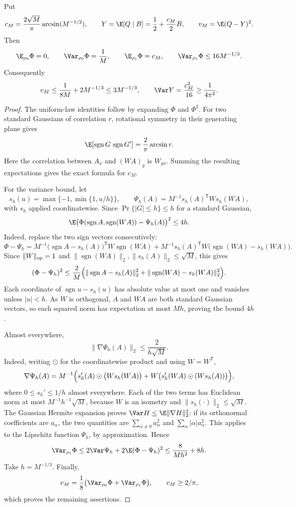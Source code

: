 \begin{lemma}\label{ian:forrelation-flatness}
Put
\[
 c_M=\frac{2\sqrt M}{\pi}\arcsin(M^{-1/2}),
 \qquad
 Y=\E[Q\mid B]=\frac12+\frac{c_M}{2}B,
 \qquad
 v_M=\E(Q-Y)^2.
\]
Then
\[
 \E_{\rho_0}\Phi=0,\qquad
 \Var_{\rho_0}\Phi=\frac1M,\qquad
 \E_{\rho_1}\Phi=c_M,\qquad
 \Var_{\rho_1}\Phi\le16M^{-1/3}.
\]
Consequently
\[
 v_M\le\frac1{8M}+2M^{-1/3}\le3M^{-1/3},
 \qquad
 \Var Y=\frac{c_M^2}{16}\ge\frac1{4\pi^2}.
\]
\end{lemma}
\begin{proof}
The uniform-law identities follow by expanding \(\Phi\) and \(\Phi^2\). For two standard Gaussians of correlation \(r\), rotational symmetry in their generating plane gives
\[
 \E[\operatorname{sgn}G\,\operatorname{sgn}G']
 =\frac2\pi\arcsin r.
\]
Here the correlation between \(A_x\) and \((WA)_y\) is \(W_{yx}\). Summing the resulting expectations gives the exact formula for \(c_M\).

For the variance bound, let
\[
 s_h(u)=\max\{-1,\min\{1,u/h\}\},\qquad
 \Psi_h(A)=M^{-1}s_h(A)^{\mathsf T}W s_h(WA),
\]
with \(s_h\) applied coordinatewise. Since \(\Pr\{|G|\le h\}\le h\) for a standard Gaussian,
\[
 \E\bigl(\Phi(\operatorname{sgn}A,\operatorname{sgn}(WA))
                 -\Psi_h(A)\bigr)^2\le4h.
\]
Indeed, replace the two sign vectors consecutively:
\[
 \Phi-\Psi_h
 =M^{-1}\bigl(\operatorname{sgn}A-s_h(A)\bigr)^{\mathsf T}W\operatorname{sgn}(WA)
 +M^{-1}s_h(A)^{\mathsf T}W\bigl(\operatorname{sgn}(WA)-s_h(WA)\bigr).
\]
Since \(\|W\|_{\rm op}=1\) and \(\|\operatorname{sgn}(WA)\|_2,\|s_h(A)\|_2\le\sqrt M\), this gives
\[
 (\Phi-\Psi_h)^2
 \le\frac2M\Bigl(\|\operatorname{sgn}A-s_h(A)\|_2^2+\|\operatorname{sgn}(WA)-s_h(WA)\|_2^2\Bigr).
\]
Each coordinate of \(\operatorname{sgn}u-s_h(u)\) has absolute value at most one and vanishes unless \(|u|<h\). As \(W\) is orthogonal, \(A\) and \(WA\) are both standard Gaussian vectors, so each squared norm has expectation at most \(Mh\), proving the bound \(4h\).

Almost everywhere,
\[
 \|\nabla\Psi_h(A)\|_2\le\frac{2}{h\sqrt M}.
\]
Indeed, writing \(\odot\) for the coordinatewise product and using \(W=W^{\mathsf T}\),
\[
 \nabla\Psi_h(A)
 =M^{-1}\Bigl(s_h'(A)\odot\bigl(Ws_h(WA)\bigr)
 +W\bigl(s_h'(WA)\odot(Ws_h(A))\bigr)\Bigr),
\]
where \(0\le s_h'\le1/h\) almost everywhere. Each of the two terms has Euclidean norm at most \(M^{-1}h^{-1}\sqrt M\), because \(W\) is an isometry and \(\|s_h(\cdot)\|_2\le\sqrt M\).
The Gaussian Hermite expansion proves
\(\Var H\le\E\|\nabla H\|_2^2\): if its orthonormal coefficients are
\(a_\alpha\), the two quantities are
\(\sum_{\alpha\ne0}a_\alpha^2\) and
\(\sum_\alpha|\alpha|a_\alpha^2\). This applies to the Lipschitz function \(\Psi_h\), by approximation. Hence
\[
 \Var_{\rho_1}\Phi
 \le2\Var\Psi_h+2\E(\Phi-\Psi_h)^2
 \le\frac8{Mh^2}+8h.
\]
Take \(h=M^{-1/3}\). Finally,
\[
 v_M=\frac18\bigl(\Var_{\rho_0}\Phi+\Var_{\rho_1}\Phi\bigr),
 \qquad c_M\ge2/\pi,
\]
which proves the remaining assertions.
\end{proof}

